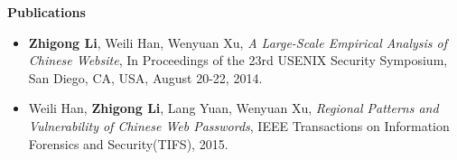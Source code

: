 \documentclass[letterpaper,10pt]{article}
\newcommand{\resheading}[1]{{\large \colorbox{mygrey}{\begin{minipage}{\textwidth}{\textbf{#1 \vphantom{p\^{E}}}}\end{minipage}}}}
\begin{document}







\resheading{Publications}
\begin{itemize}
 \item 
 \textbf{Zhigong Li}, Weili Han, Wenyuan Xu, \emph{A Large-Scale Empirical Analysis of Chinese Website}, In Proceedings of the 23rd {USENIX} Security Symposium, San Diego, CA, USA, August 20-22, 2014.
 \item Weili Han, \textbf{Zhigong Li}, Lang Yuan, Wenyuan Xu, \emph{Regional Patterns and Vulnerability of Chinese Web Passwords}, IEEE Transactions on Information Forensics and Security(TIFS), 2015.
\end{itemize}
\end{document}
